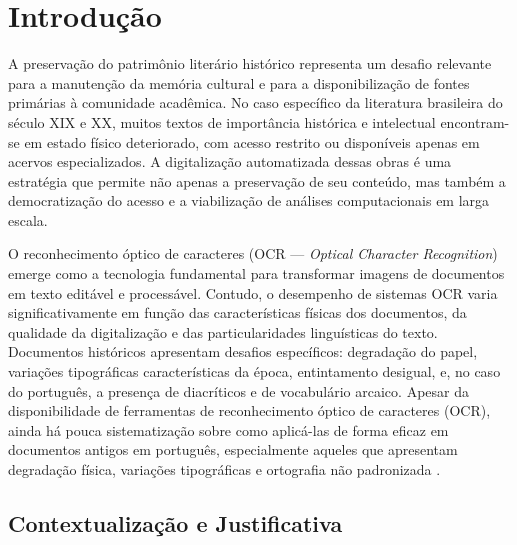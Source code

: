 \documentclass[
  12pt,
  oneside,
  a4paper,
  chapter=TITLE,
  section=TITLE,
  english,
  brazil
]{abntex2}
\begin{document}
\listoftables*
\cleardoublepage

\tableofcontents*
\cleardoublepage

\textual

\chapter{Introdução}

A preservação do patrimônio literário histórico representa um desafio relevante para
a manutenção da memória cultural e para a disponibilização de fontes primárias à
comunidade acadêmica. No caso específico da literatura brasileira do século XIX e XX,
muitos textos de importância histórica e intelectual encontram-se em estado físico
deteriorado, com acesso restrito ou disponíveis apenas em acervos especializados. A
digitalização automatizada dessas obras é uma estratégia que permite não apenas a
preservação de seu conteúdo, mas também a democratização do acesso e a viabilização
de análises computacionais em larga escala.

O reconhecimento óptico de caracteres (OCR --- \textit{Optical Character Recognition})
emerge como a tecnologia fundamental para transformar imagens de documentos em texto
editável e processável. Contudo, o desempenho de sistemas OCR varia significativamente
em função das características físicas dos documentos, da qualidade da digitalização e
das particularidades linguísticas do texto. Documentos históricos apresentam desafios
específicos: degradação do papel, variações tipográficas características da época,
entintamento desigual, e, no caso do português, a presença de diacríticos e de
vocabulário arcaico.
Apesar da disponibilidade de ferramentas de reconhecimento óptico de caracteres (OCR),
ainda há pouca sistematização sobre como aplicá-las de forma eficaz em documentos
antigos em português, especialmente aqueles que apresentam degradação física, variações tipográficas e ortografia não padronizada \cite{clausner2011}.



\section{Contextualização e Justificativa}
\end{document}
